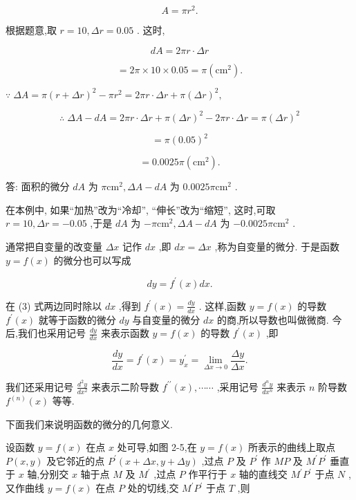 \documentclass[lang=cn,newtx,12pt,scheme=chinese]{elegantbook}
\begin{document}
\[
A = \pi {r}^{2}.
\]

根据题意,取 \(r = {10},{\Delta r} = {0.05}\) . 这时,

\[
{dA} = {2\pi r} \cdot {\Delta r}
\]

\[
= {2\pi } \times {10} \times {0.05} = \pi \left( {\mathrm{{cm}}}^{2}\right) \text{.}
\]

\(\because \;{\Delta A} = \pi {\left( r + \Delta r\right) }^{2} - \pi {r}^{2} = {2\pi r} \cdot {\Delta r} + \pi {\left( \Delta r\right) }^{2},\)

\[
\therefore \;{\Delta A} - {dA} = {2\pi r} \cdot {\Delta r} + \pi {\left( \Delta r\right) }^{2} - {2\pi r} \cdot {\Delta r} = \pi {\left( \Delta r\right) }^{2}
\]

\[
= \pi {\left( {0.05}\right) }^{2}
\]

\[
= {0.0025\pi }\left( {\mathrm{{cm}}}^{2}\right) \text{.}
\]

答: 面积的微分 \({dA}\) 为 \(\pi {\mathrm{{cm}}}^{2},{\Delta A} - {dA}\) 为 \({0.0025\pi }{\mathrm{{cm}}}^{2}\) .

在本例中, 如果“加热”改为“冷却”, “伸长”改为“缩短”, 这时,可取 \(r = {10},{\Delta r} = - {0.05}\) ,于是 \({dA}\) 为 \(- \pi {\mathrm{{cm}}}^{2},{\Delta A} - {dA}\) 为 \(- {0.0025\pi }{\mathrm{{cm}}}^{2}\) .

通常把自变量的改变量 \({\Delta x}\) 记作 \({dx}\) ,即 \({dx} = {\Delta x}\) ,称为自变量的微分. 于是函数 \(y = f\left( x\right)\) 的微分也可以写成

\[
{dy} = {f}^{\prime }\left( x\right) {dx}. \tag{3}
\]

在 (3) 式两边同时除以 \({dx}\) ,得到 \({f}^{\prime }\left( x\right) = \frac{dy}{dx}\) . 这样,函数 \(y = f\left( x\right)\) 的导数 \({f}^{\prime }\left( x\right)\) 就等于函数的微分 \({dy}\) 与自变量的微分 \({dx}\) 的商,所以导数也叫做微商. 今后,我们也采用记号 \(\frac{dy}{dx}\) 来表示函数 \(y = f\left( x\right)\) 的导数 \({f}^{\prime }\left( x\right)\) ,即

\[
\frac{dy}{dx} = {f}^{\prime }\left( x\right) = {y}_{x}^{\prime } = \mathop{\lim }\limits_{{{\Delta x} \rightarrow 0}}\frac{\Delta y}{\Delta x}.
\]

我们还采用记号 \(\frac{{d}^{2}y}{d{x}^{2}}\) 来表示二阶导数 \({f}^{\prime \prime }\left( x\right) ,\cdots \cdots\) ,采用记号 \(\frac{{d}^{n}y}{d{x}^{n}}\) 来表示 \(n\) 阶导数 \({f}^{\left( n\right) }\left( x\right)\) 等等.

下面我们来说明函数的微分的几何意义.

设函数 \(y = f\left( x\right)\) 在点 \(x\) 处可导,如图 2-5,在 \(y = f\left( x\right)\) 所表示的曲线上取点 \(P\left( {x,y}\right)\) 及它邻近的点 \({P}^{\prime }\left( {x + {\Delta x},y + {\Delta y}}\right)\) ,过点 \(P\) 及 \({P}^{\prime }\) 作 \({MP}\) 及 \({M}^{\prime }{P}^{\prime }\) 垂直于 \(x\) 轴,分别交 \(x\) 轴于点 \(M\) 及 \({M}^{\prime }\) ,过点 \(P\) 作平行于 \(x\) 轴的直线交 \({M}^{\prime }{P}^{\prime }\) 于点 \(N\) ,又作曲线 \(y = f\left( x\right)\) 在点 \(P\) 处的切线,交 \({M}^{\prime }{P}^{\prime }\) 于点 \(T\) ,则
\end{document}
